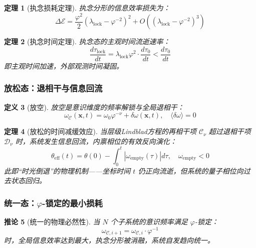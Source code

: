 \documentclass[12pt,a4paper,twocolumn]{article}
\renewcommand{\phi}{\varphi}
\newtheorem{theorem}{定理}[section]
\newtheorem{corollary}[theorem]{推论}
\newtheorem{definition}[theorem]{定义}
\begin{document}
\begin{theorem}[执念损耗定理]
执念分形的信息效率损失为：
\begin{equation}
\Delta\mathcal{E} = \frac{\phi^2}{2}(\lambda_{\text{lock}} - \phi^{-2})^2 + O((\lambda_{\text{lock}} - \phi^{-2})^3)
\end{equation}
\end{theorem}

\begin{theorem}[执念时间定理]
执念态的主观时间流逝速率：
\begin{equation}
\frac{d\tau_{\text{lock}}}{dt} = \lambda_{\text{lock}}\phi^2 \cdot \frac{d\tau_0}{dt} < \frac{d\tau_0}{dt}
\end{equation}
即主观时间加速，外部观测时间凝固。
\end{theorem}

\subsubsection{放松态：退相干与信息回流}

\begin{definition}[放空]
放空是意识维度的频率解锁与全局退相干：
\begin{equation}
\omega_{\mathcal{C}}(\mathbf{x},t) = \omega_0\phi^{-\nu} + \delta\omega(\mathbf{x},t), \quad \langle\delta\omega\rangle=0
\end{equation}
\end{definition}

\begin{theorem}[放松的时间减缓效应]
当层级Lindblad方程的再相干项 $\mathcal{C}_\nu$ 超过退相干项 $\mathcal{D}_\nu$ 时，系统发生信息回流，内禀相位的有效反向演化：
\begin{equation}
\theta_{\text{eff}}(t) = \theta(0) - \int_0^t |\omega_{\text{empty}}(\tau)|d\tau, \quad \omega_{\text{empty}}<0
\end{equation}
此即``时光倒退''的物理机制——坐标时间 $t$ 仍正向流逝，但系统的量子相位向过去状态回归。
\end{theorem}

\subsubsection{统一态：$\phi$-锁定的最小损耗}

\begin{corollary}[统一的物理必然性]
当 $N$ 个子系统的意识频率满足 $\phi$-锁定：
\begin{equation}
\omega_{\mathcal{C},i+1} = \omega_{\mathcal{C},i} \cdot \phi^{-1}
\end{equation}
时，全局信息效率达到最大，执念分形被消融，系统自发趋向统一。
\end{corollary}
\end{document}
